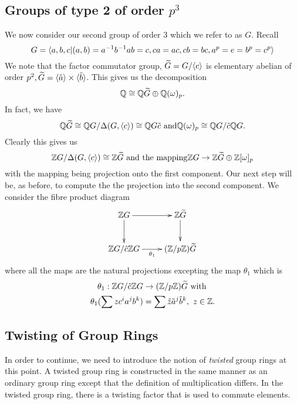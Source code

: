 \documentclass[11pt]{report}
\begin{document}
\subsection{Groups of type 2 of order $p^3$}
We now consider our second group of order 3 which we refer to as 
$G$. Recall
\begin{equation}
G= \langle a,b,c \vert (a,b) = a^{-1}b^{-1}ab = c, 
ca=ac, cb=bc, a^p = e = b^p = c^p \rangle\label{eqn:definitionofg}\\
\end{equation}
We note that the factor commutator group, $\widetilde{G} = G/\langle c \rangle$ is elementary
abelian of order $p^2, \widetilde{G} = \langle \tilde{a} \rangle \times \langle \tilde{b} \rangle$. This gives us the 
decomposition
\[ \mathbb{Q}\cong \mathbb{Q}\widetilde{G} \oplus \mathbb{Q}(\omega)_p.\]
In fact, we have
\begin{equation*}
 \mathbb{Q}\widetilde{G} \cong  \mathbb{Q}{}G/\Delta(G,\langle c \rangle)\cong
 \mathbb{Q}{}G\tilde{c}\ \mathrm{and}\ \\
 \mathbb{Q}(\omega)_p\cong \mathbb{Q}{}G/\tilde{c} \mathbb{Q}{}G.\\
\end{equation*}
Clearly this gives us
\begin{equation*}
\integers{}G/\Delta(G,\ggen{c})\cong\integers\widetilde{G}\ 
\mathrm{and \ the\ mapping}\ \\
\integers{}G\rightarrow\integers\widetilde{G}\oplus\integers{}[\omega]_p\\
\end{equation*}
with the mapping being projection onto the first component. Our next step will 
be, as before, to compute the
the projection into the second component. We consider the fibre 
product diagram
\[
\xymatrix {
\integers{}G \ar[r] \ar[d] 
&\integers\widetilde{G} \ar[d]\\
\integers{}G/\hat{c}\integers{}G \ar[r]_{\theta{}_1} 
&(\integers/p\integers)\widetilde{G}\\
}\]
where all the maps are the natural projections excepting the map $\theta_1$ which is
\begin{align*}
\theta_1:\integers{}G/\hat{c}\integers{}G &\rightarrow (\integers/p\integers)\widetilde{G}\ \mathrm{with} \\
\theta_1(\sum{}zc^ia^jb^k) &= \sum\tilde{z}\tilde{a}^j\tilde{b}^k,\ z \in \integers{}.\\
\end{align*}
\subsection{Twisting of Group Rings}
In order to continue, we need to introduce the notion of \emph{twisted }
group rings at this
point. A twisted group ring is constructed in the same manner as 
an ordinary group ring
except that the definition of multiplication differs. In the 
twisted group ring, there is a
twisting factor that is used to commute elements.
\end{document}
